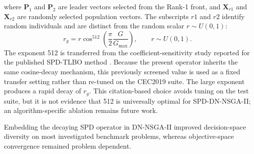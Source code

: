 where $\bm{P}_1$ and $\bm{P}_2$ are leader vectors selected from the Rank-1 front, and $\bm{X}_{r1}$ and $\bm{X}_{r2}$ are randomly selected population vectors. The subscripts $r1$ and $r2$ identify random individuals and are distinct from the random scalar $r\sim U(0,1)$:
\begin{equation}
	r_g=r\cos^{512}\!\left(\frac{\pi}{2}\frac{G}{G_{\max}}\right),\qquad r\sim U(0,1).
\end{equation}
The exponent 512 is transferred from the coefficient-sensitivity study reported for the published SPD-TLBO method \cite{sun2025stochastic}. Because the present operator inherits the same cosine-decay mechanism, this previously screened value is used as a fixed transfer setting rather than re-tuned on the CEC2019 suite. The large exponent produces a rapid decay of $r_g$. This citation-based choice avoids tuning on the test suite, but it is not evidence that 512 is universally optimal for SPD-DN-NSGA-II; an algorithm-specific ablation remains future work.
\par Embedding the decaying SPD operator in DN-NSGA-II improved decision-space diversity on most investigated benchmark problems, whereas objective-space convergence remained problem dependent.
